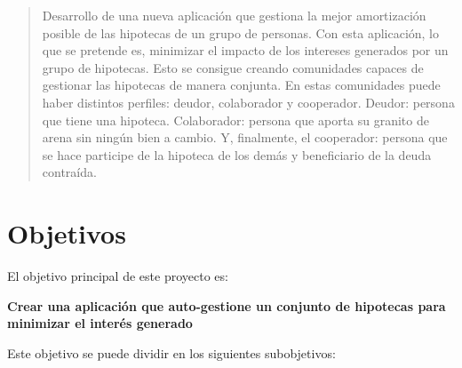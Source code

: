 \documentclass[10pt]{article}
\begin{document}
\title{}
\author{Diego Pardilla}
\date{\today}


\maketitle

\begin{abstract}
Desarrollo de una nueva aplicación que gestiona la mejor amortización posible de las hipotecas de un grupo de personas. Con esta aplicación, lo que se pretende es, minimizar el impacto de los intereses generados por un grupo de hipotecas. Esto se consigue creando comunidades capaces de gestionar las hipotecas de manera conjunta. En estas comunidades puede haber distintos perfiles: deudor, colaborador y cooperador. Deudor: persona que tiene una hipoteca. Colaborador: persona que aporta su granito de arena sin ningún bien a cambio. Y, finalmente, el cooperador: persona que se hace participe de la hipoteca de los demás y beneficiario de la deuda contraída.
\end{abstract}

\section{Objetivos}

El objetivo principal de este proyecto es:

\begin{center}
\bf{Crear una aplicación que auto-gestione un conjunto de hipotecas para minimizar el interés generado}
\end{center}

Este objetivo se puede dividir en los siguientes subobjetivos:
\end{document}
